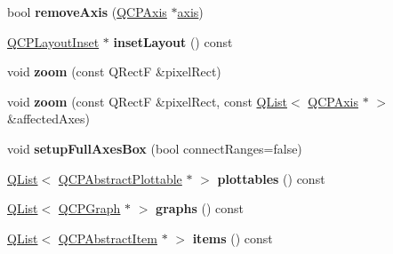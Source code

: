 \begin{DoxyCompactItemize}
\item 
bool {\bfseries remove\+Axis} (\hyperlink{class_q_c_p_axis}{Q\+C\+P\+Axis} $\ast$\hyperlink{class_q_c_p_axis_rect_a560de44e47a4af0f86c59102a094b1e4}{axis})\hypertarget{class_q_c_p_axis_rect_a03c39cd9704f0d36fb6cf980cdddcbaa}{}\label{class_q_c_p_axis_rect_a03c39cd9704f0d36fb6cf980cdddcbaa}

\item 
\hyperlink{class_q_c_p_layout_inset}{Q\+C\+P\+Layout\+Inset} $\ast$ {\bfseries inset\+Layout} () const \hypertarget{class_q_c_p_axis_rect_ab7407983cf60528f429506131e77966e}{}\label{class_q_c_p_axis_rect_ab7407983cf60528f429506131e77966e}

\item 
void {\bfseries zoom} (const Q\+RectF \&pixel\+Rect)\hypertarget{class_q_c_p_axis_rect_a5fc8460564e81dcc2a9343dc8bc1fe67}{}\label{class_q_c_p_axis_rect_a5fc8460564e81dcc2a9343dc8bc1fe67}

\item 
void {\bfseries zoom} (const Q\+RectF \&pixel\+Rect, const \hyperlink{class_q_list}{Q\+List}$<$ \hyperlink{class_q_c_p_axis}{Q\+C\+P\+Axis} $\ast$ $>$ \&affected\+Axes)\hypertarget{class_q_c_p_axis_rect_ae481c28b50e10cfbbec59fde45e77367}{}\label{class_q_c_p_axis_rect_ae481c28b50e10cfbbec59fde45e77367}

\item 
void {\bfseries setup\+Full\+Axes\+Box} (bool connect\+Ranges=false)\hypertarget{class_q_c_p_axis_rect_a5fa906175447b14206954f77fc7f1ef4}{}\label{class_q_c_p_axis_rect_a5fa906175447b14206954f77fc7f1ef4}

\item 
\hyperlink{class_q_list}{Q\+List}$<$ \hyperlink{class_q_c_p_abstract_plottable}{Q\+C\+P\+Abstract\+Plottable} $\ast$ $>$ {\bfseries plottables} () const \hypertarget{class_q_c_p_axis_rect_a1fe8ccb8f0fb79d0026a994a7ff7a2dc}{}\label{class_q_c_p_axis_rect_a1fe8ccb8f0fb79d0026a994a7ff7a2dc}

\item 
\hyperlink{class_q_list}{Q\+List}$<$ \hyperlink{class_q_c_p_graph}{Q\+C\+P\+Graph} $\ast$ $>$ {\bfseries graphs} () const \hypertarget{class_q_c_p_axis_rect_aa9cb4c172b5d15ff45527abcd1a794ea}{}\label{class_q_c_p_axis_rect_aa9cb4c172b5d15ff45527abcd1a794ea}

\item 
\hyperlink{class_q_list}{Q\+List}$<$ \hyperlink{class_q_c_p_abstract_item}{Q\+C\+P\+Abstract\+Item} $\ast$ $>$ {\bfseries items} () const \hypertarget{class_q_c_p_axis_rect_a991e1501fdc5af6ee30fff09b789210a}{}\label{class_q_c_p_axis_rect_a991e1501fdc5af6ee30fff09b789210a}


\end{DoxyCompactItemize}
